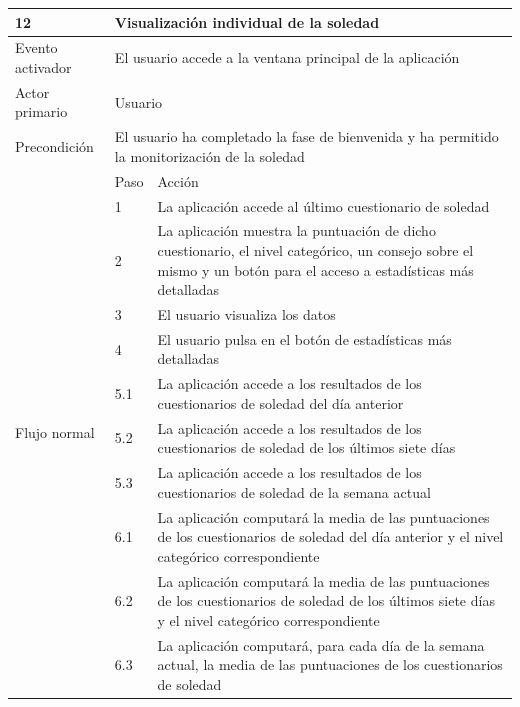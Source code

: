     \begin{table}[h]
        \centering
        \begin{tabularx}{\textwidth}{|l|l|X|}
            \hline
            12 & \multicolumn{2}{|X|}{Visualización individual de la soledad} \\
            \hline
            Evento activador & \multicolumn{2}{|X|}{El usuario accede a la ventana principal de la aplicación} \\
            \hline
            Actor primario & \multicolumn{2}{|X|}{Usuario} \\
            \hline
            Precondición & \multicolumn{2}{|X|}{El usuario ha completado la fase de bienvenida y ha permitido la monitorización de la soledad} \\
            \hline
            \multirow{13}{*}{Flujo normal} & Paso & Acción \\
            \cline{2-3} & 1 & La aplicación accede al último cuestionario de soledad \\
            \cline{2-3} & 2 & La aplicación muestra la puntuación de dicho cuestionario, el nivel categórico, un consejo sobre el mismo y un botón para el acceso a estadísticas más detalladas \\
            \cline{2-3} & 3 & El usuario visualiza los datos \\
            \cline{2-3} & 4 & El usuario pulsa en el botón de estadísticas más detalladas \\
            \cline{2-3} & 5.1 & La aplicación accede a los resultados de los cuestionarios de soledad del día anterior \\
            \cline{2-3} & 5.2 & La aplicación accede a los resultados de los cuestionarios de soledad de los últimos siete días \\
            \cline{2-3} & 5.3 & La aplicación accede a los resultados de los cuestionarios de soledad de la semana actual \\
            \cline{2-3} & 6.1 & La aplicación computará la media de las puntuaciones de los cuestionarios de soledad del día anterior y el nivel categórico correspondiente \\
            \cline{2-3} & 6.2 & La aplicación computará la media de las puntuaciones de los cuestionarios de soledad de los últimos siete días y el nivel categórico correspondiente \\
            \cline{2-3} & 6.3 & La aplicación computará, para cada día de la semana actual, la media de las puntuaciones de los cuestionarios de soledad \\

\end{tabularx}
\end{table}

